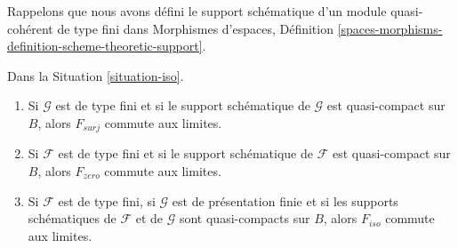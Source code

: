 \noindent
Rappelons que nous avons défini le support schématique d'un module
quasi-cohérent de type fini dans Morphismes d'espaces, Définition
\ref{spaces-morphisms-definition-scheme-theoretic-support}.

\begin{lemma}
\label{lemma-iso-limits}
Dans la Situation \ref{situation-iso}.
\begin{enumerate}
\item Si $\mathcal{G}$ est de type fini et si le support schématique
de $\mathcal{G}$ est quasi-compact sur $B$, alors $F_{surj}$ commute aux
limites.
\item Si $\mathcal{F}$ est de type fini et si le support schématique
de $\mathcal{F}$ est quasi-compact sur $B$, alors
$F_{zero}$ commute aux limites.
\item Si $\mathcal{F}$ est de type fini,
si $\mathcal{G}$ est de présentation finie et si les
supports schématiques de $\mathcal{F}$ et de $\mathcal{G}$ sont
quasi-compacts sur $B$, alors $F_{iso}$ commute aux limites.
\end{enumerate}
\end{lemma}

